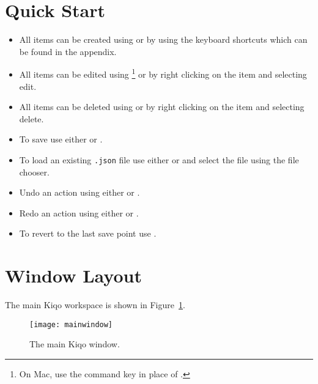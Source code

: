 \documentclass[11pt,fleqn]{book} %
\begin{document}
\section{Quick Start}
\begin{itemize}
    \item All items can be created using  or by using the keyboard shortcuts which can be found
    in the appendix.
    \item All items can be edited using \footnote{On Mac, use the command key \keys{\cmd} in place of \keys{\ctrl}.}
     or by right clicking on the item and selecting edit.
    \item All items can be deleted using  or by right clicking on the item and selecting delete.
    \item To save use either  or .
    \item To load an existing {\tt .json} file use either  or  and select the file using the file chooser.
    \item Undo an action using either  or .
    \item Redo an action using either  or .
    \item To revert to the last save point use .
\end{itemize}
\clearpage

\section{Window Layout}
The main Kiqo workspace is shown in Figure~\ref{fig:mainwindow}.

\begin{figure}[H]
  \centering
  \texttt{[image: mainwindow]}
  \caption{The main Kiqo window.\label{fig:mainwindow}}
\end{figure}
\end{document}
